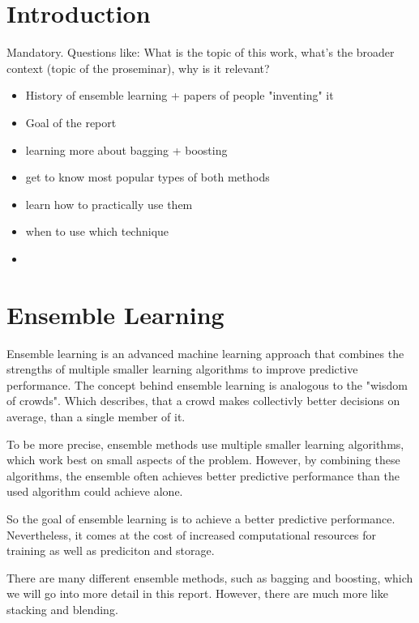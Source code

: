 \section{Introduction}
Mandatory. Questions like: What is the topic of this work, what's the broader context (topic of the proseminar), why is it relevant?

\begin{itemize}
    \item History of ensemble learning + papers of people "inventing" it
    \item Goal of the report
    \item learning more about bagging + boosting
    \item get to know most popular types of both methods
    \item learn how to practically use them
    \item when to use which technique
    \item 
\end{itemize}
\section{Ensemble Learning}

Ensemble learning is an advanced machine learning approach that combines the 
strengths of multiple smaller learning algorithms to improve predictive 
performance. 
The concept behind ensemble learning is analogous to the "wisdom of crowds".
Which describes, that a crowd makes collectivly better decisions on average,
than a single member of it.

To be more precise, ensemble methods use multiple smaller learning algorithms,
which work best on small aspects of the problem. However, by combining these
algorithms, the ensemble often achieves better predictive performance than 
the used algorithm could achieve alone.

So the goal of ensemble learning is to achieve a better predictive performance.
Nevertheless, it comes at the cost of increased computational resources for 
training as well as prediciton and storage.

There are many different ensemble methods, such as bagging and boosting, which
we will go into more detail in this report. However, there are much more like
stacking and blending.

%

